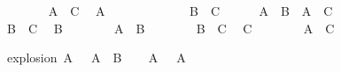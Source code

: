 \begin{isabellebody}
\isanewline
\ \ \ \ \ \ \isamarkupfalse%
\ {\isachardoublequoteopen}A\ {\isasymor}\ C{\isachardoublequoteclose}\ \isamarkupfalse%
\ {\isacharbackquoteopen}A{\isacharbackquoteclose}\isacommand{{\isachardot}{\isachardot}}\isamarkupfalse%
\isanewline
\ \ \ \ \isamarkupfalse%
\isanewline
\ \ \isamarkupfalse%
\isanewline
\ \ \ \ \isamarkupfalse%
\ {\isachardoublequoteopen}B\ {\isasymand}\ C{\isachardoublequoteclose}\isanewline
\ \ \ \ \isamarkupfalse%
\ {\isachardoublequoteopen}{\isacharparenleft}A\ {\isasymor}\ B{\isacharparenright}\ {\isasymand}\ {\isacharparenleft}A\ {\isasymor}\ C{\isacharparenright}{\isachardoublequoteclose}\isanewline
\ \ \ \ \isamarkupfalse%
\isanewline
\ \ \ \ \ \ \isamarkupfalse%
\ {\isacharbackquoteopen}B\ {\isasymand}\ C{\isacharbackquoteclose}\ \isamarkupfalse%
\ {\isachardoublequoteopen}B{\isachardoublequoteclose}\isacommand{{\isachardot}{\isachardot}}\isamarkupfalse%
\isanewline
\ \ \ \ \ \ \isamarkupfalse%
\ {\isachardoublequoteopen}A\ {\isasymor}\ B{\isachardoublequoteclose}\isacommand{{\isachardot}{\isachardot}}\isamarkupfalse%
\isanewline
\ \ \ \ \ \ \isamarkupfalse%
\ {\isacharbackquoteopen}B\ {\isasymand}\ C{\isacharbackquoteclose}\ \isamarkupfalse%
\ {\isachardoublequoteopen}C{\isachardoublequoteclose}\isacommand{{\isachardot}{\isachardot}}\isamarkupfalse%
\isanewline
\ \ \ \ \ \ \isamarkupfalse%
\ {\isachardoublequoteopen}A\ {\isasymor}\ C{\isachardoublequoteclose}\isacommand{{\isachardot}{\isachardot}}\isamarkupfalse%
\isanewline
\ \ \ \ \isamarkupfalse%
\isanewline
\ \ \isamarkupfalse%
\isanewline
{}\isamarkupfalse%
%
\endisatagproof
{\isafoldproof}%
%
\isadelimproof
%
\endisadelimproof
%
\begin{isamarkuptext}%
\begin{Answer}[ref = explosion] \end{Answer}%
\end{isamarkuptext}\isamarkuptrue%
\isamarkupfalse%
\ explosion{\isacharcolon}\ {\isachardoublequoteopen}A\ {\isasymand}\ {\isasymnot}\ A\ {\isasymlongrightarrow}\ B{\isachardoublequoteclose}\isanewline
%
\isadelimproof
%
\endisadelimproof
%
\isatagproof
{}\isamarkupfalse%
\isanewline
\ \ \isamarkupfalse%
\ {\isachardoublequoteopen}A\ {\isasymand}\ {\isasymnot}\ A{\isachardoublequoteclose}\isanewline

\end{isabellebody}
